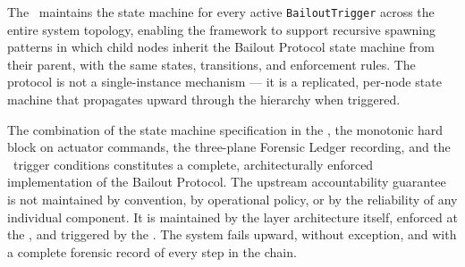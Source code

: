 The \fact\ maintains the state machine for every active \texttt{BailoutTrigger} across the entire system topology, enabling the framework to support recursive spawning patterns in which child nodes inherit the Bailout Protocol state machine from their parent, with the same states, transitions, and enforcement rules. The protocol is not a single-instance mechanism --- it is a replicated, per-node state machine that propagates upward through the hierarchy when triggered.

The combination of the state machine specification in the \fact, the monotonic hard block on actuator commands, the three-plane Forensic Ledger recording, and the \bounds\ trigger conditions constitutes a complete, architecturally enforced implementation of the Bailout Protocol. The upstream accountability guarantee is not maintained by convention, by operational policy, or by the reliability of any individual component. It is maintained by the layer architecture itself, enforced at the \fact, and triggered by the \bounds. The system fails upward, without exception, and with a complete forensic record of every step in the chain.
